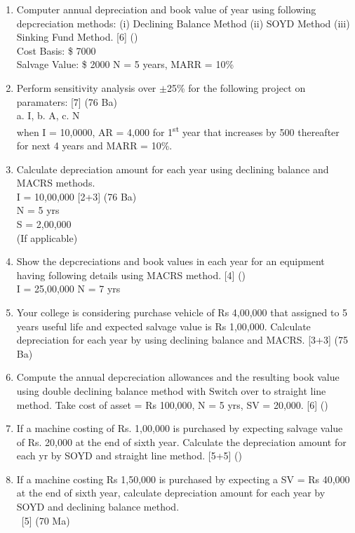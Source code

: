 \documentclass[12pt]{article}
\newcommand{\enter}{\\\textcolor{white}{1}}
\newcommand{\super}[1]{\textsuperscript{#1}}
\begin{document}
\begin{enumerate}
			\item Computer annual depreciation and book value of year using following depcreciation methods: (i) Declining Balance Method (ii) SOYD Method (iii) Sinking Fund Method. \hfill [6] ()\\
			Cost Basis: \$ 7000\\
			Salvage Value: \$ 2000
			N = 5 years, MARR = 10\%

			\item Perform sensitivity analysis over $\pm$25\% for the following project on paramaters: \hfill [7] (76 Ba)\\
			a. I, b. A, c. N\\
			when I = 10,0000, AR = 4,000 for 1\super{st} year that increases by 500 thereafter for next 4 years and MARR = 10\%.

			\item Calculate depreciation amount for each year using declining balance and MACRS methods.\\
			I = 10,00,000 \hfill [2+3] (76 Ba)\\
			N = 5 yrs\\
			S = 2,00,000\\
			(If applicable)

			\item Show the depcreciations and book values in each year for an equipment having following details using MACRS method. \hfill [4] ()\\
			I = 25,00,000
			N = 7 yrs

			\item Your college is considering purchase vehicle of Rs 4,00,000 that assigned to 5 years useful life and expected salvage value is Rs 1,00,000. Calculate depreciation for each year by using declining balance and MACRS. \hfill [3+3] (75 Ba)

			\item Compute the annual depcreciation allowances and the resulting book value using double declining balance method with Switch over to straight line method. Take cost of asset = Rs 100,000, N = 5 yrs, SV = 20,000. \hfill [6] ()

			\item If a machine costing of Rs. 1,00,000 is purchased by expecting salvage value of Rs. 20,000 at the end of sixth year. Calculate the depreciation amount for each yr by SOYD and straight line method. \hfill [5+5] ()

			\item If a machine costing Rs 1,50,000 is purchased by expecting a SV = Rs 40,000 at the end of sixth year, calculate depreciation amount for each year by SOYD and declining balance method.
			\enter\hfill [5] (70 Ma)


\end{enumerate}
\end{document}

